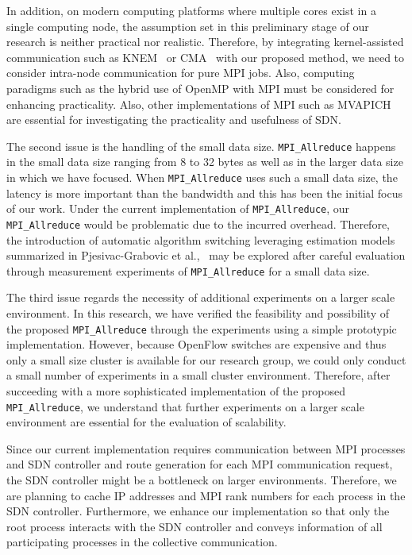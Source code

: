 In addition, on modern computing platforms where multiple cores exist in
a single computing node, the assumption set in this preliminary stage of
our research is neither practical nor realistic. Therefore, by
integrating kernel-assisted communication such as KNEM~\cite{Goglin2013}
or CMA~\cite{cma} with our proposed method, we need to consider
intra-node communication for pure MPI jobs. Also, computing paradigms
such as the hybrid use of OpenMP with MPI must be considered for
enhancing practicality. Also, other implementations of MPI such as
MVAPICH~\cite{mvapich} are essential for investigating the practicality
and usefulness of SDN\@.

The second issue is the handling of the small data size.
\texttt{MPI\_Allreduce} happens in the small data size ranging from 8 to
32 bytes as well as in the larger data size in which we have focused.
When \texttt{MPI\_Allreduce} uses such a small data size, the latency is
more important than the bandwidth and this has been the initial focus of
our work. Under the current implementation of \texttt{MPI\_Allreduce},
our \texttt{MPI\_Allreduce} would be problematic due to the incurred
overhead. Therefore, the introduction of automatic algorithm switching
leveraging estimation models summarized in Pjesivac-Grabovic et
al.,~\cite{PjesivacGrbovic} may be explored after careful evaluation through
measurement experiments of \texttt{MPI\_Allreduce} for a small data size.

The third issue regards the necessity of additional experiments on a
larger scale environment. In this research, we have verified the
feasibility and possibility of the proposed \texttt{MPI\_Allreduce}
through the experiments using a simple prototypic implementation.
However, because OpenFlow switches are expensive and thus only a small
size cluster is available for our research group, we could only conduct
a small number of experiments in a small cluster environment. Therefore,
after succeeding with a more sophisticated implementation of the
proposed \texttt{MPI\_Allreduce}, we understand that further experiments
on a larger scale environment are essential for the evaluation of
scalability.

Since our current implementation requires communication between MPI
processes and SDN controller and route generation for each MPI
communication request, the SDN controller might be a bottleneck on
larger environments. Therefore, we are planning to cache IP addresses
and MPI rank numbers for each process in the SDN controller.
Furthermore, we enhance our implementation so that only the root process
interacts with the SDN controller and conveys information of all
participating processes in the collective communication.

